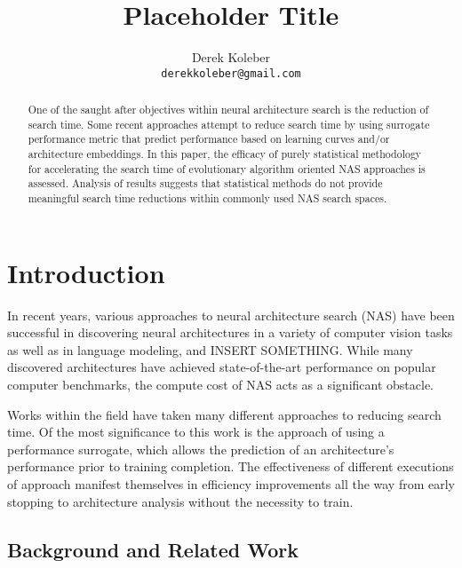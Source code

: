 \documentclass[twocolumn]{article}
\title{Placeholder Title}
\author{%
  Derek Koleber \\
  \texttt{derekkoleber@gmail.com}  
}
\begin{document}
\maketitle

\begin{abstract}
    One of the saught after objectives within neural architecture search
    is the reduction of search time. Some recent approaches attempt to reduce
    search time by using surrogate performance metric that predict performance
    based on learning curves and/or architecture embeddings. 
    In this paper, the efficacy of purely statistical methodology for accelerating
    the search time of evolutionary algorithm oriented NAS approaches is assessed. Analysis of results
    suggests that statistical methods do not provide meaningful search time reductions
    within commonly used NAS search spaces.
\end{abstract}

\section{Introduction}

    In recent years, various approaches to neural architecture search (NAS) have been 
successful in discovering neural architectures in a variety of computer vision
tasks as well as in language modeling, and INSERT SOMETHING. While many discovered architectures
have achieved state-of-the-art performance on popular computer benchmarks,
the compute cost of NAS acts as a significant obstacle.

    Works within the field have taken many different approaches to reducing search time.
Of the most significance to this work is the approach of using a performance surrogate,
which allows the prediction of an architecture's performance prior to training completion.
The effectiveness of different executions of approach manifest themselves in efficiency improvements 
all the way from early stopping to \cite{arch_pred_1} architecture analysis without the necessity to train.
\cite{snas} \cite{darts} 
\cite{arch_pred_1}
\cite{econas}
\cite{amoebanet}
\cite{acc_pred_1}
\cite{pnas}
\cite{lemonade}
\cite{nasnet}
\cite{learning_curve_1}
\cite{synthetic_samples}
\cite{snas}
\cite{enas}
\cite{cars}
\cite{rl_nas}
\cite{evolved_transformer}
\cite{multitask_1}
\cite{mnas}
\cite{obj_detection_1}
\cite{hardware_darts}



\subsection{Background and Related Work}
\end{document}
